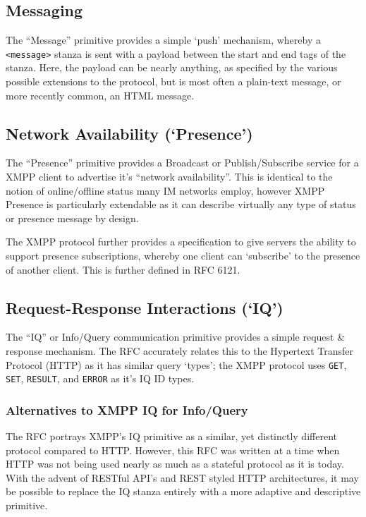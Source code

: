 \documentclass{article}
\begin{document}
\subsection{Messaging}
The ``Message'' primitive provides a simple `push' mechanism, whereby a
\texttt{<message>} stanza is sent with a payload between the start and end tags
of the stanza. Here, the payload can be nearly anything, as specified by the
various possible extensions to the protocol, but is most often a plain-text
message, or more recently common, an HTML message.

\subsection{Network Availability (`Presence')}
The ``Presence'' primitive provides a Broadcast or Publish/Subscribe service for
a XMPP client to advertise it's ``network availability''. This is identical to
the notion of online/offline status many IM networks employ, however XMPP
Presence is particularly extendable as it can describe virtually any type of
status or presence message by design.

The XMPP protocol further provides a specification to give servers the ability
to support presence subscriptions, whereby one client can `subscribe' to the
presence of another client. This is further defined in RFC 6121. 

\subsection{Request-Response Interactions (`IQ')}
The ``IQ'' or Info/Query communication primitive provides a simple request \&
response mechanism. The RFC accurately relates this to the Hypertext Transfer
Protocol (HTTP) as it has similar query `types'; the XMPP protocol uses
\texttt{GET}, \texttt{SET}, \texttt{RESULT}, and \texttt{ERROR} as it's IQ ID
types.

\subsubsection{Alternatives to XMPP IQ for Info/Query}
The RFC portrays XMPP's IQ primitive as a similar, yet distinctly different
protocol compared to HTTP. However, this RFC was written at a time when HTTP was
not being used nearly as much as a stateful protocol as it is today. With the
advent of RESTful API's and REST styled HTTP architectures, it may be possible
to replace the IQ stanza entirely with a more adaptive and descriptive
primitive.
\end{document}
